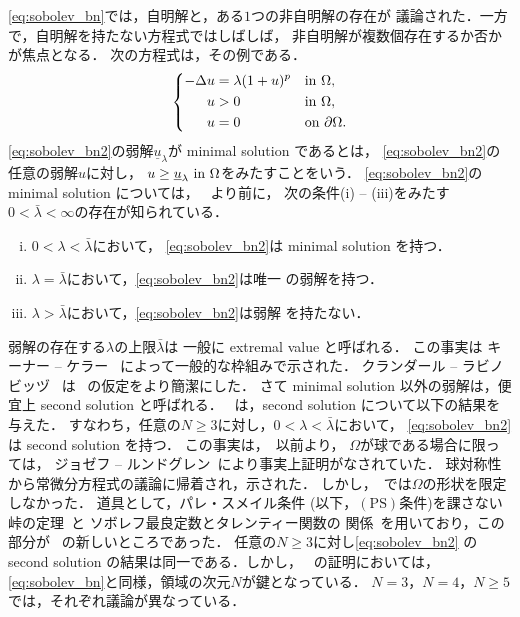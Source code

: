 \eqref{eq:sobolev_bn}では，自明解と，ある$1$つの非自明解の存在が
議論された．一方で，自明解を持たない方程式ではしばしば，
非自明解が複数個存在するか否かが焦点となる．
次の方程式は，その例である．
\begin{align}
 \left\{
 \begin{aligned}
  -\Delta u &= \lambda (1 + u)^p  & &\text{in}~ \Omega,  \\
  u &> 0 & &\text{in}~ \Omega, \\
  u &= 0 & &\text{on}~ \partial\Omega.
 \end{aligned}
 \right. \label{eq:sobolev_bn2}
\end{align}
\eqref{eq:sobolev_bn2}の弱解$\underline{u}_\lambda$が
minimal solution であるとは，
\eqref{eq:sobolev_bn2}の任意の弱解$u$に対し，
$u \geq \underline{u}_\lambda ~\text{in}~ \Omega$をみたすことをいう．
\eqref{eq:sobolev_bn2}の minimal solution については，
\cite{MR709644}~より前に，
次の条件(i) -- (iii)をみたす$0 < \bar{\lambda} < \infty$の存在が知られている．
\begin{enumerate}[(i)]
 \item $0 < \lambda < \bar{\lambda}$において，
       \eqref{eq:sobolev_bn2}は minimal solution を持つ．
 \item $\lambda = \bar{\lambda}$において，\eqref{eq:sobolev_bn2}は唯一
       の弱解を持つ．
 \item $\lambda > \bar{\lambda}$において，\eqref{eq:sobolev_bn2}は弱解
       を持たない．
\end{enumerate}
弱解の存在する$\lambda$の上限$\bar{\lambda}$は
一般に extremal value と呼ばれる．
この事実は
キーナー -- ケラー \cite{MR0346305}~によって一般的な枠組みで示された．
クランダール -- ラビノビッヅ \cite{MR0382848}~は
\cite{MR0346305}~の仮定をより簡潔にした．
さて minimal solution 以外の弱解は，便宜上 second solution と呼ばれる．
\cite{MR709644}~は，second solution について以下の結果を与えた．
すなわち，任意の$N \geq 3$に対し，$0 < \lambda < \bar{\lambda}$において，
\eqref{eq:sobolev_bn2}は second solution を持つ．
この事実は，\cite{MR709644}~以前より，
$\Omega$が球である場合に限っては，
ジョゼフ -- ルンドグレン\cite{MR0340701}~により事実上証明がなされていた．
球対称性から常微分方程式の議論に帰着され，示された．
しかし，\cite{MR709644}~では$\Omega$の形状を限定しなかった．
道具として，パレ・スメイル条件
(以下，$(\mathrm{PS})$条件)を課さない峠の定理~\cite{MR0370183}と
ソボレフ最良定数とタレンティー関数の
関係~\cite{MR0463908}を用いており，この部分が
\cite{MR709644}~の新しいところであった．
任意の$N \geq 3$に対し\eqref{eq:sobolev_bn2}
の second solution の結果は同一である．しかし，
\cite{MR709644}~の証明においては，
\eqref{eq:sobolev_bn}と同様，領域の次元$N$が鍵となっている．
$N = 3$，$N = 4$，$N \geq 5$では，それぞれ議論が異なっている．


